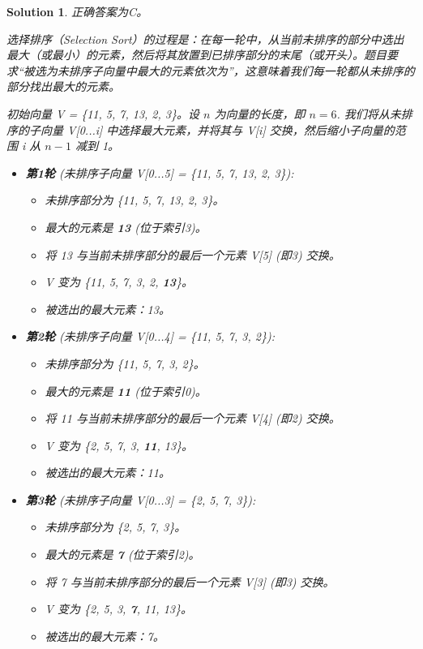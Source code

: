 \documentclass[UTF8]{report}
\newtheorem{solution}{Solution}
\theoremstyle{MyLineTheoremStyle} %
\theoremstyle{MyBlockTheoremStyle} %
\theoremstyle{MySubsubsectionStyle} %
\begin{document}
\begin{solution}
正确答案为C。

选择排序（Selection Sort）的过程是：在每一轮中，从当前未排序的部分中选出最大（或最小）的元素，然后将其放置到已排序部分的末尾（或开头）。题目要求“被选为未排序子向量中最大的元素依次为”，这意味着我们每一轮都从未排序的部分找出最大的元素。

初始向量 V = \{11, 5, 7, 13, 2, 3\}。设 $n$ 为向量的长度，即 $n=6$.
我们将从未排序的子向量 V[0...i] 中选择最大元素，并将其与 V[i] 交换，然后缩小子向量的范围 i 从 $n-1$ 减到 1。

\begin{itemize}
    \item \textbf{第1轮} (未排序子向量 V[0...5] = \{11, 5, 7, 13, 2, 3\}):
    \begin{itemize}
        \item 未排序部分为 \{11, 5, 7, 13, 2, 3\}。
        \item 最大的元素是 \textbf{13} (位于索引3)。
        \item 将 13 与当前未排序部分的最后一个元素 V[5] (即3) 交换。
        \item V 变为 \{11, 5, 7, 3, 2, \textbf{13}\}。
        \item 被选出的最大元素：13。
    \end{itemize}

    \item \textbf{第2轮} (未排序子向量 V[0...4] = \{11, 5, 7, 3, 2\}):
    \begin{itemize}
        \item 未排序部分为 \{11, 5, 7, 3, 2\}。
        \item 最大的元素是 \textbf{11} (位于索引0)。
        \item 将 11 与当前未排序部分的最后一个元素 V[4] (即2) 交换。
        \item V 变为 \{2, 5, 7, 3, \textbf{11}, 13\}。
        \item 被选出的最大元素：11。
    \end{itemize}

    \item \textbf{第3轮} (未排序子向量 V[0...3] = \{2, 5, 7, 3\}):
    \begin{itemize}
        \item 未排序部分为 \{2, 5, 7, 3\}。
        \item 最大的元素是 \textbf{7} (位于索引2)。
        \item 将 7 与当前未排序部分的最后一个元素 V[3] (即3) 交换。
        \item V 变为 \{2, 5, 3, \textbf{7}, 11, 13\}。
        \item 被选出的最大元素：7。
    \end{itemize}


\end{itemize}
\end{solution}
\end{document}
